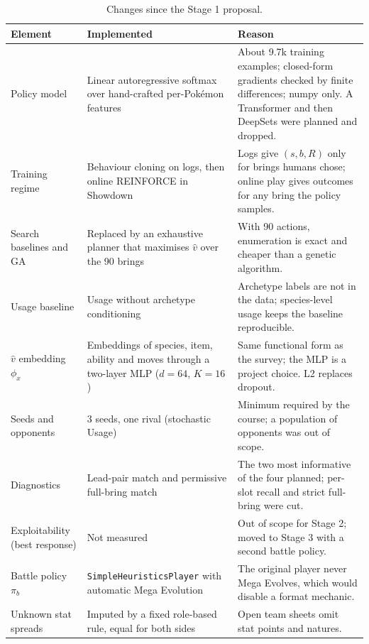 \documentclass[conference]{IEEEtran}
\begin{document}
\begin{table}[!t]
\centering
\caption{Changes since the Stage 1 proposal.}
\label{tab:changes}
\footnotesize
\renewcommand{\arraystretch}{1.15}
\begin{tabular}{@{}p{3.6cm}p{4.6cm}p{8.2cm}@{}}
\toprule
\textbf{Element} & \textbf{Implemented} & \textbf{Reason} \\
\midrule
Policy model & Linear autoregressive softmax over hand-crafted per-Pok\'emon features & About 9.7k training examples; closed-form gradients checked by finite differences; numpy only. A Transformer and then DeepSets were planned and dropped. \\
Training regime & Behaviour cloning on logs, then online REINFORCE in Showdown & Logs give $(s,b,R)$ only for brings humans chose; online play gives outcomes for any bring the policy samples. \\
Search baselines and GA & Replaced by an exhaustive planner that maximises $\hat v$ over the 90 brings & With 90 actions, enumeration is exact and cheaper than a genetic algorithm. \\
Usage baseline & Usage without archetype conditioning & Archetype labels are not in the data; species-level usage keeps the baseline reproducible. \\
$\hat v$ embedding $\phi_x$ & Embeddings of species, item, ability and moves through a two-layer MLP ($d=64$, $K=16$) & Same functional form as the survey; the MLP is a project choice. L2 replaces dropout. \\
Seeds and opponents & 3 seeds, one rival (stochastic Usage) & Minimum required by the course; a population of opponents was out of scope. \\
Diagnostics & Lead-pair match and permissive full-bring match & The two most informative of the four planned; per-slot recall and strict full-bring were cut. \\
Exploitability (best response) & Not measured & Out of scope for Stage 2; moved to Stage 3 with a second battle policy. \\
Battle policy $\pi_b$ & \texttt{SimpleHeuristicsPlayer} with automatic Mega Evolution & The original player never Mega Evolves, which would disable a format mechanic. \\
Unknown stat spreads & Imputed by a fixed role-based rule, equal for both sides & Open team sheets omit stat points and natures. \\
\bottomrule
\end{tabular}
\end{table}
\end{document}
